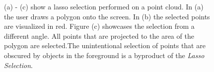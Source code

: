 \begin{figure}
\centering
{}\par\medskip
{}\par\medskip        
{}
\caption[Screenshots of the workflow of a lasso selection. (a) shows the lasso, (b) the selected points, (c) shows the selected points from a different angle. ]
{(a) - (c) show a lasso selection performed on a point cloud. In (a) the user draws a polygon onto the screen. In (b) the selected points are visualized in red. Figure (c) showcases the selection from a different angle. All points that are projected to the area of the polygon are selected.The unintentional selection of points that are obscured by objects in the foreground is a byproduct of the \textit{Lasso Selection}. }
\label{fig:lasso}
\end{figure}


